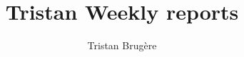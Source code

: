 \documentclass[a4paper,12pt]{article}
\title{Tristan Weekly reports}
\author{Tristan Brugère}
\date{}
\begin{document}
\maketitle{}
\tableofcontents{}
\pagebreak{}


\FloatBarrier{}
\printbibliography{}
\end{document}
